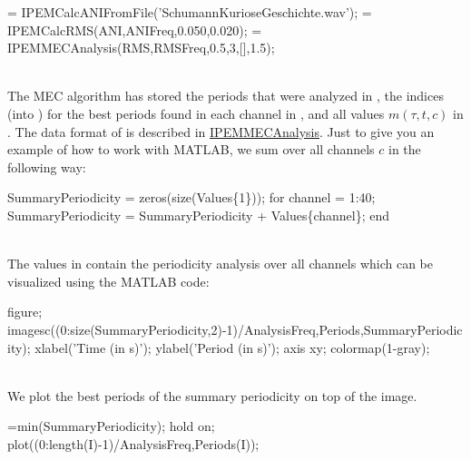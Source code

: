 \begin{IPEMCodeEnvironment}
 = IPEMCalcANIFromFile('SchumannKurioseGeschichte.wav');
 = IPEMCalcRMS(ANI,ANIFreq,0.050,0.020);
 = IPEMMECAnalysis(RMS,RMSFreq,0.5,3,[],1.5);
\end{IPEMCodeEnvironment}\\

The MEC algorithm has stored the periods that were analyzed in
, the indices (into
) for the best periods found in each
channel in , and all values $m(\tau,t,c)$ in
. The data format of
 is described in
\hyperlink{FuncRef:IPEMMECAnalysis}{IPEMMECAnalysis}. Just to give
you an example of how to work with MATLAB, we sum over all
channels $c$ in the following way:\\

\begin{IPEMCodeEnvironment}
SummaryPeriodicity = zeros(size(Values\{1\}));
\newline for channel = 1:40;
\newline SummaryPeriodicity = SummaryPeriodicity + Values\{channel\};
\newline end
\end{IPEMCodeEnvironment}\\

The values in  contain the
periodicity analysis over all channels which can be visualized
using the MATLAB code:\\

\begin{IPEMCodeEnvironment}
figure;
\newline imagesc((0:size(SummaryPeriodicity,2)-1)/AnalysisFreq,Periods,SummaryPeriodicity);
\newline xlabel('Time (in s)'); ylabel('Period (in s)');
\newline axis xy; colormap(1-gray);
\end{IPEMCodeEnvironment}\\

We plot the best periods of the summary periodicity on top of the
image.\\

\begin{IPEMCodeEnvironment}
[M,I]=min(SummaryPeriodicity); hold on;
\newline plot((0:length(I)-1)/AnalysisFreq,Periods(I));
\end{IPEMCodeEnvironment}\\

